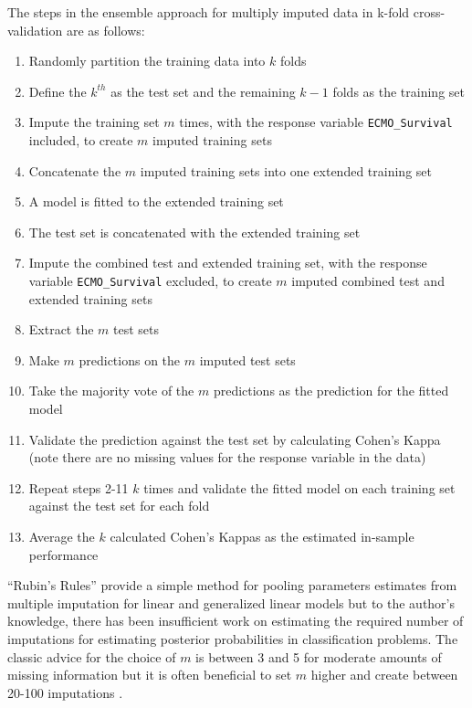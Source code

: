 \documentclass[12pt,]{article}
\providecommand{\tightlist}{%
  \setlength{\itemsep}{0pt}\setlength{\parskip}{0pt}}
\begin{document}
The steps in the ensemble approach for multiply imputed data in k-fold
cross-validation are as follows:

\begin{enumerate}
\def\labelenumi{\arabic{enumi}.}
\tightlist
\item
  Randomly partition the training data into \(k\) folds
\item
  Define the \(k^{th}\) as the test set and the remaining \(k-1\) folds
  as the training set
\item
  Impute the training set \(m\) times, with the response variable
  \texttt{ECMO\_Survival} included, to create \(m\) imputed training
  sets
\item
  Concatenate the \(m\) imputed training sets into one extended training
  set
\item
  A model is fitted to the extended training set
\item
  The test set is concatenated with the extended training set
\item
  Impute the combined test and extended training set, with the response
  variable \texttt{ECMO\_Survival} excluded, to create \(m\) imputed
  combined test and extended training sets
\item
  Extract the \(m\) test sets
\item
  Make \(m\) predictions on the \(m\) imputed test sets
\item
  Take the majority vote of the \(m\) predictions as the prediction for
  the fitted model
\item
  Validate the prediction against the test set by calculating Cohen's
  Kappa (note there are no missing values for the response variable in
  the data)
\item
  Repeat steps 2-11 \(k\) times and validate the fitted model on each
  training set against the test set for each fold
\item
  Average the \(k\) calculated Cohen's Kappas as the estimated in-sample
  performance
\end{enumerate}

``Rubin's Rules'' \citep{rubin_inference_1976} provide a simple method
for pooling parameters estimates from multiple imputation for linear and
generalized linear models but to the author's knowledge, there has been
insufficient work on estimating the required number of imputations for
estimating posterior probabilities in classification problems. The
classic advice for the choice of \(m\) is between 3 and 5 for moderate
amounts of missing information but it is often beneficial to set \(m\)
higher and create between 20-100 imputations
\citep{van_buuren_flexible_2012}.
\end{document}
